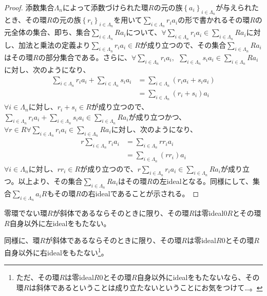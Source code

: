 \documentclass[dvipdfmx]{jsarticle}
\begin{document}
\begin{proof}
添数集合$\varLambda_{n}$によって添数づけられた環$R$の元の族$\left\{ a_{i} \right\}_{i \in \varLambda_{n}}$が与えられたとき、その環$R$の元の族$\left\{ r_{i} \right\}_{i \in \varLambda_{n}}$を用いて$\sum_{i \in \varLambda_{n}} {r_{i}a_{i}}$の形で書かれるその環$R$の元全体の集合、即ち、集合$\sum_{i \in \varLambda_{n}} {Ra_{i}}$について、$\forall\sum_{i \in \varLambda_{n}} {r_{i}a_{i}} \in \sum_{i \in \varLambda_{n}} {Ra_{i}}$に対し、加法と乗法の定義より$\sum_{i \in \varLambda_{n}} {r_{i}a_{i}} \in R$が成り立つので、その集合$\sum_{i \in \varLambda_{n}} {Ra_{i}}$はその環$R$の部分集合である。さらに、$\forall\sum_{i \in \varLambda_{n}} {r_{i}a_{i}},\ \ \sum_{i \in \varLambda_{n}} {s_{i}a_{i}} \in \sum_{i \in \varLambda_{n}} {Ra_{i}}$に対し、次のようになり、
\begin{align*}
\sum_{i \in \varLambda_{n}} {r_{i}a_{i}} + \sum_{i \in \varLambda_{n}} {s_{i}a_{i}} &= \sum_{i \in \varLambda_{n}} \left( r_{i}a_{i} + s_{i}a_{i} \right)\\
&= \sum_{i \in \varLambda_{n}} {\left( r_{i} + s_{i} \right)a_{i}}
\end{align*}
$\forall i \in \varLambda_{n}$に対し、$r_{i} + s_{i} \in R$が成り立つので、$\sum_{i \in \varLambda_{n}} {r_{i}a_{i}} + \sum_{i \in \varLambda_{n}} {s_{i}a_{i}} \in \sum_{i \in \varLambda_{n}} {Ra_{i}}$が成り立つかつ、$\forall r \in R\forall\sum_{i \in \varLambda_{n}} {r_{i}a_{i}} \in \sum_{i \in \varLambda_{n}} {Ra_{i}}$に対し、次のようになり、
\begin{align*}
r\sum_{i \in \varLambda_{n}} {r_{i}a_{i}} &= \sum_{i \in \varLambda_{n}} {rr_{i}a_{i}}\\
&= \sum_{i \in \varLambda_{n}} {\left( rr_{i} \right)a_{i}}
\end{align*}
$\forall i \in \varLambda_{n}$に対し、$rr_{i} \in R$が成り立つので、$r\sum_{i \in \varLambda_{n}} {r_{i}a_{i}} \in \sum_{i \in \varLambda_{n}} {Ra_{i}}$が成り立つ。以上より、その集合$\sum_{i \in \varLambda_{n}} {Ra_{i}}$はその環$R$の左idealとなる。同様にして、集合$\sum_{i \in \varLambda_{n}} {a_{i}R}$もその環$R$の右idealであることが示される。
\end{proof}
\begin{thm}\label{3.3.2.4}
零環でない環$R$が斜体であるならそのときに限り、その環$R$は零ideal$0R$とその環$R$自身以外に左idealをもたない。\par
同様に、環$R$が斜体であるならそのときに限り、その環$R$は零ideal$R0$とその環$R$自身以外に右idealをもたない\footnote{ただ、その環$R$は零ideal$R0$とその環$R$自身以外にidealをもたないなら、その環$R$は斜体であるということは成り立たないということにお気をつけて…。}。
\end{thm}
\end{document}
